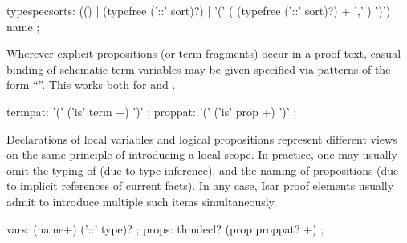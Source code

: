 \begin{isabellebody}
\begin{isamarkuptext}
\begin{rail}
    typespecsorts: (() | (typefree ('::' sort)?) | '(' ( (typefree ('::' sort)?) + ',' ) ')') name
    ;
  \end{rail}%
\end{isamarkuptext}%
\isamarkuptrue%
%
\isamarkuptrue%
%
\begin{isamarkuptext}%
Wherever explicit propositions (or term fragments) occur in a proof
  text, casual binding of schematic term variables may be given
  specified via patterns of the form ``''.  This works both for  and .

  \begin{rail}
    termpat: '(' ('is' term +) ')'
    ;
    proppat: '(' ('is' prop +) ')'
    ;
  \end{rail}

  \medskip Declarations of local variables  and
  logical propositions  represent different views on
  the same principle of introducing a local scope.  In practice, one
  may usually omit the typing of  (due to
  type-inference), and the naming of propositions (due to implicit
  references of current facts).  In any case, Isar proof elements
  usually admit to introduce multiple such items simultaneously.

  \begin{rail}
    vars: (name+) ('::' type)?
    ;
    props: thmdecl? (prop proppat? +)
    ;
  \end{rail}


\end{isamarkuptext}
\end{isabellebody}
